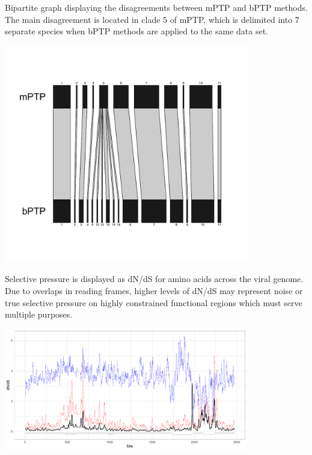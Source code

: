 \documentclass[11pt]{article}
\begin{document}
\begin{suppfigure}
\centering
\caption{
Bipartite graph displaying the disagreements between mPTP and bPTP methods. The main disagreement is located in clade 5 of mPTP, which is delimited into 7 separate species when bPTP methods are applied to the same data set.
}
\includegraphics[width=0.8\textwidth]{supplementaryinfo/web.mPTP.bPTP-edited.pdf}
\label{fig:genetree5}
\end{suppfigure}
\clearpage


\begin{suppfigure}
\centering
\caption{
Selective pressure is displayed as dN/dS for amino acids across the viral genome. Due to overlaps in reading frames, higher levels of dN/dS may represent noise or true selective pressure on highly constrained functional regions which must serve multiple purposes.
}
\includegraphics[width=0.8\textwidth]{supplementaryinfo/selectionplot.pdf}
\label{fig:genetree5}
\end{suppfigure}
\clearpage
\end{document}
